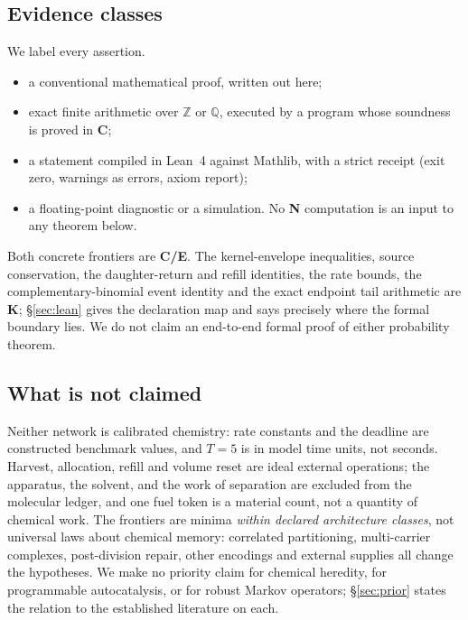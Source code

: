\documentclass[11pt]{article}
\theoremstyle{plain}
\theoremstyle{definition}
\theoremstyle{remark}
\begin{document}
\subsection{Evidence classes}\label{sec:evidence}

We label every assertion.

\begin{itemize}\itemsep2pt
\item[\textbf{C}] a conventional mathematical proof, written out here;
\item[\textbf{E}] exact finite arithmetic over $\mathbb{Z}$ or $\mathbb{Q}$,
executed by a program whose soundness is proved in \textbf{C};
\item[\textbf{K}] a statement compiled in Lean~4 against Mathlib, with a strict
receipt (exit zero, warnings as errors, axiom report);
\item[\textbf{N}] a floating-point diagnostic or a simulation. No \textbf{N}
computation is an input to any theorem below.
\end{itemize}

Both concrete frontiers are \textbf{C/E}. The kernel-envelope inequalities,
source conservation, the daughter-return and refill identities, the rate
bounds, the complementary-binomial event identity and the exact endpoint tail
arithmetic are \textbf{K}; \S\ref{sec:lean} gives the declaration map and says
precisely where the formal boundary lies. We do not claim an end-to-end formal
proof of either probability theorem.

\subsection{What is not claimed}

Neither network is calibrated chemistry: rate constants and the deadline are
constructed benchmark values, and $T=5$ is in model time units, not seconds.
Harvest, allocation, refill and volume reset are ideal external operations;
the apparatus, the solvent, and the work of separation are excluded from the
molecular ledger, and one fuel token is a material count, not a quantity of
chemical work. The frontiers are minima \emph{within declared architecture
classes}, not universal laws about chemical memory: correlated partitioning,
multi-carrier complexes, post-division repair, other encodings and external
supplies all change the hypotheses. We make no priority claim for chemical
heredity, for programmable autocatalysis, or for robust Markov operators;
\S\ref{sec:prior} states the relation to the established literature on each.
\end{document}
